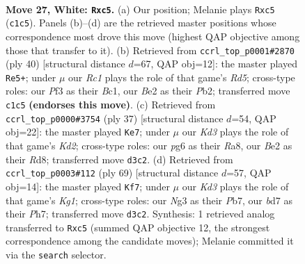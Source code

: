 \documentclass[11pt]{article}
\begin{document}
\clearpage

\begin{figure}[p]\centering
\begin{subfigure}{0.46\textwidth}\centering
\resizebox{\linewidth}{!}{%
\newchessgame
\chessboard[
  setfen={r4kr1/1p1b1p1p/p5p1/2bp4/8/3K1PN1/PP2B1PP/2R4R w - - 0 27},
  showmover=false,
  pgfstyle=straightmove, color=movearrow, markmove={c1-c5}
]}
\caption{}
\end{subfigure}\hfill
\begin{subfigure}{0.46\textwidth}\centering
\resizebox{\linewidth}{!}{%
\newchessgame
\chessboard[
  setfen={r3k2r/bp1b1p2/p4P1p/3R2p1/8/6N1/PPP3PP/R1B4K w kq - 1 21},
  showmover=false,
  pgfstyle=straightmove, color=movearrow, markmove={d5-e5}
]}
\caption{}
\end{subfigure}
\\[4pt]
\begin{subfigure}{0.46\textwidth}\centering
\resizebox{\linewidth}{!}{%
\newchessgame
\chessboard[
  setfen={r2r4/1p1k1ppp/1p2p3/2b5/3nP3/P5P1/1P1B1P1P/2RB1RK1 b - - 2 19},
  showmover=false,
  pgfstyle=straightmove, color=movearrow, markmove={d7-e7}
]}
\caption{}
\end{subfigure}\hfill
\begin{subfigure}{0.46\textwidth}\centering
\resizebox{\linewidth}{!}{%
\newchessgame
\chessboard[
  setfen={4rrk1/1p5p/p4B1P/P4pP1/4b3/1P4b1/1P1R4/R2K1B2 b - - 3 35},
  showmover=false,
  pgfstyle=straightmove, color=movearrow, markmove={g8-f7}
]}
\caption{}
\end{subfigure}
\caption{\textbf{Move 27, White: \texttt{Rxc5}.} (a) Our position; Melanie plays \texttt{Rxc5} (\texttt{c1c5}). Panels (b)--(d) are the retrieved master positions whose correspondence most drove this move (highest QAP objective among those that transfer to it). (b) Retrieved from \texttt{ccrl\_top\_p0001\#2870} (ply 40) [structural distance $d$=67, QAP obj=12]: the master played \texttt{Re5+}; under $\mu$ our \emph{Rc1} plays the role of that game's \emph{Rd5}; cross-type roles: our \emph{P}f3 as their \emph{B}c1, our \emph{B}e2 as their \emph{P}b2; transferred move \texttt{c1c5} \textbf{(endorses this move)}. (c) Retrieved from \texttt{ccrl\_top\_p0000\#3754} (ply 37) [structural distance $d$=54, QAP obj=22]: the master played \texttt{Ke7}; under $\mu$ our \emph{Kd3} plays the role of that game's \emph{Kd2}; cross-type roles: our \emph{p}g6 as their \emph{R}a8, our \emph{B}e2 as their \emph{R}d8; transferred move \texttt{d3c2}. (d) Retrieved from \texttt{ccrl\_top\_p0003\#112} (ply 69) [structural distance $d$=57, QAP obj=14]: the master played \texttt{Kf7}; under $\mu$ our \emph{Kd3} plays the role of that game's \emph{Kg1}; cross-type roles: our \emph{N}g3 as their \emph{P}b7, our \emph{b}d7 as their \emph{P}h7; transferred move \texttt{d3c2}. Synthesis: 1 retrieved analog transferred to \texttt{Rxc5} (summed QAP objective 12, the strongest correspondence among the candidate moves); Melanie committed it via the \texttt{search} selector.}
\label{fig:thought-m52}
\end{figure}
\end{document}
